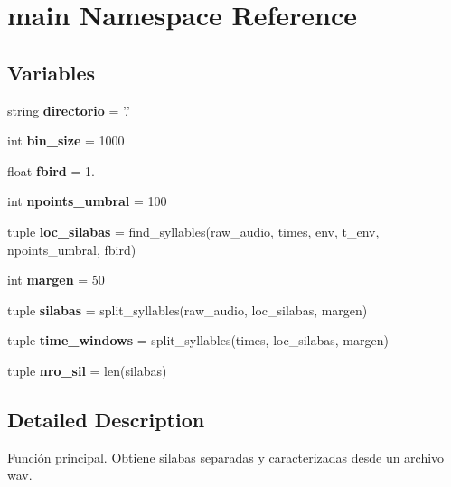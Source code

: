 \hypertarget{namespacemain}{\section{main Namespace Reference}
\label{namespacemain}
}
\subsection*{Variables}
\begin{DoxyCompactItemize}
\item 
\hypertarget{namespacemain_a1f329badab01a5cc4d74098570f9c016}{string {\bfseries directorio} = '.'}\label{namespacemain_a1f329badab01a5cc4d74098570f9c016}

\item 
\hypertarget{namespacemain_a85ee3f0c3866909eef36ad79eca54e7e}{int {\bfseries bin\-\_\-size} = 1000}\label{namespacemain_a85ee3f0c3866909eef36ad79eca54e7e}

\item 
\hypertarget{namespacemain_a2e7ccd286de7f186d13e6000f7a30de0}{float {\bfseries fbird} = 1.}\label{namespacemain_a2e7ccd286de7f186d13e6000f7a30de0}

\item 
\hypertarget{namespacemain_a7785dad4cd4e864c7e6ab5c007c8b6c6}{int {\bfseries npoints\-\_\-umbral} = 100}\label{namespacemain_a7785dad4cd4e864c7e6ab5c007c8b6c6}

\item 
\hypertarget{namespacemain_a8ce01e0cf12c089a1e0485b05b3c0e89}{tuple {\bfseries loc\-\_\-silabas} = find\-\_\-syllables(raw\-\_\-audio, times, env, t\-\_\-env, npoints\-\_\-umbral, fbird)}\label{namespacemain_a8ce01e0cf12c089a1e0485b05b3c0e89}

\item 
\hypertarget{namespacemain_ad301b43507fe5673ea435cb7448d9aeb}{int {\bfseries margen} = 50}\label{namespacemain_ad301b43507fe5673ea435cb7448d9aeb}

\item 
\hypertarget{namespacemain_aa11065a6750d1f21bbf112bb0626b100}{tuple {\bfseries silabas} = split\-\_\-syllables(raw\-\_\-audio, loc\-\_\-silabas, margen)}\label{namespacemain_aa11065a6750d1f21bbf112bb0626b100}

\item 
\hypertarget{namespacemain_af1fdd5fd4eb57043abbd70a3e1855034}{tuple {\bfseries time\-\_\-windows} = split\-\_\-syllables(times, loc\-\_\-silabas, margen)}\label{namespacemain_af1fdd5fd4eb57043abbd70a3e1855034}

\item 
\hypertarget{namespacemain_adad33bab13feee57cfb0fd209502e5d4}{tuple {\bfseries nro\-\_\-sil} = len(silabas)}\label{namespacemain_adad33bab13feee57cfb0fd209502e5d4}

\end{DoxyCompactItemize}


\subsection{Detailed Description}
\begin{DoxyVerb}Función principal. Obtiene silabas separadas y caracterizadas desde un archivo wav.
\end{DoxyVerb}
 